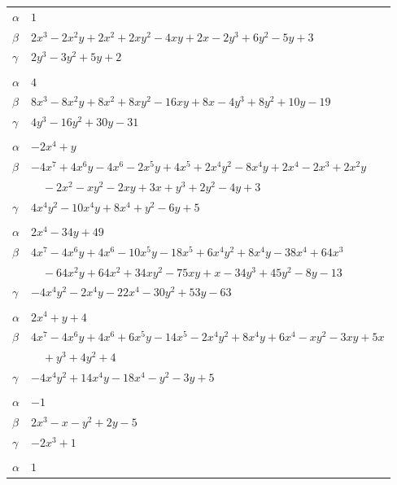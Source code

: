 \documentclass[11pt]{article}
\begin{document}
\begin{longtable}{@{}ll@{}}
$\alpha$ & $1$\\
$\beta$ & $2x^{3}-2x^{2}y+2x^{2}+2xy^{2}-4xy+2x-2y^{3}+6y^{2}-5y+3$\\
$\gamma$ & $2y^{3}-3y^{2}+5y+2$\\
\addlinespace[3pt]
\multicolumn{2}{@{}l}{$\{i,j\}=\{7,14\}$, $k_{ij}=3\cdot 17$}\\
$\alpha$ & $4$\\
$\beta$ & $8x^{3}-8x^{2}y+8x^{2}+8xy^{2}-16xy+8x-4y^{3}+8y^{2}+10y-19$\\
$\gamma$ & $4y^{3}-16y^{2}+30y-31$\\
\addlinespace[3pt]
\multicolumn{2}{@{}l}{$\{i,j\}=\{7,18\}$, $k_{ij}=3$}\\
$\alpha$ & $-2x^{4}+y$\\
$\beta$ & $-4x^{7}+4x^{6}y-4x^{6}-2x^{5}y+4x^{5}+2x^{4}y^{2}-8x^{4}y+2x^{4}-2x^{3}+2x^{2}y$\\
 & $\quad -2x^{2}-xy^{2}-2xy+3x+y^{3}+2y^{2}-4y+3$\\
$\gamma$ & $4x^{4}y^{2}-10x^{4}y+8x^{4}+y^{2}-6y+5$\\
\addlinespace[3pt]
\multicolumn{2}{@{}l}{$\{i,j\}=\{7,24\}$, $k_{ij}=5\cdot 17$}\\
$\alpha$ & $2x^{4}-34y+49$\\
$\beta$ & $4x^{7}-4x^{6}y+4x^{6}-10x^{5}y-18x^{5}+6x^{4}y^{2}+8x^{4}y-38x^{4}+64x^{3}$\\
 & $\quad -64x^{2}y+64x^{2}+34xy^{2}-75xy+x-34y^{3}+45y^{2}-8y-13$\\
$\gamma$ & $-4x^{4}y^{2}-2x^{4}y-22x^{4}-30y^{2}+53y-63$\\
\addlinespace[3pt]
\multicolumn{2}{@{}l}{$\{i,j\}=\{7,26\}$, $k_{ij}=17$}\\
$\alpha$ & $2x^{4}+y+4$\\
$\beta$ & $4x^{7}-4x^{6}y+4x^{6}+6x^{5}y-14x^{5}-2x^{4}y^{2}+8x^{4}y+6x^{4}-xy^{2}-3xy+5x$\\
 & $\quad +y^{3}+4y^{2}+4$\\
$\gamma$ & $-4x^{4}y^{2}+14x^{4}y-18x^{4}-y^{2}-3y+5$\\
\addlinespace[3pt]
\multicolumn{2}{@{}l}{$\{i,j\}=\{8,12\}$, $k_{ij}=2\cdot 3$}\\
$\alpha$ & $-1$\\
$\beta$ & $2x^{3}-x-y^{2}+2y-5$\\
$\gamma$ & $-2x^{3}+1$\\
\addlinespace[3pt]
\multicolumn{2}{@{}l}{$\{i,j\}=\{8,15\}$, $k_{ij}=2\cdot 3\cdot 5\cdot 17$}\\
$\alpha$ & $1$\\

\end{longtable}
\end{document}
